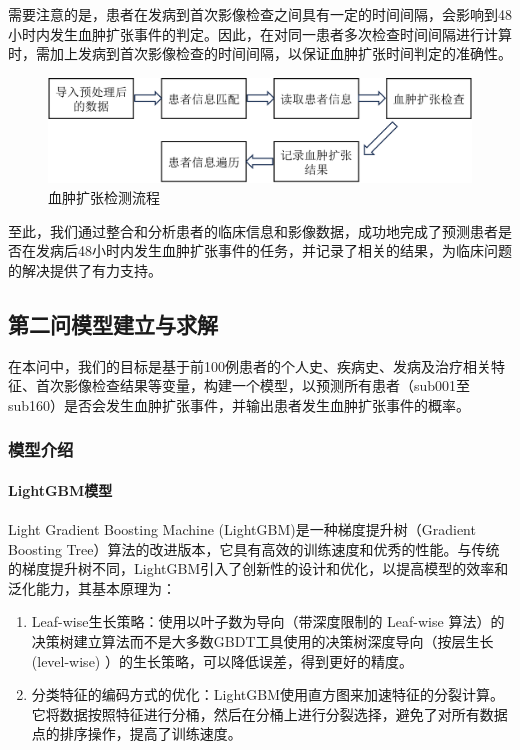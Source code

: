 \documentclass[bwprint]{gmcmthesis}
\begin{document}
需要注意的是，患者在发病到首次影像检查之间具有一定的时间间隔，会影响到48小时内发生血肿扩张事件的判定。因此，在对同一患者多次检查时间间隔进行计算时，需加上发病到首次影像检查的时间间隔，以保证血肿扩张时间判定的准确性。

\begin{figure}[h]
    \centering
    \includegraphics[width = \linewidth]{figures/1a解题思路.png}
    \caption{血肿扩张检测流程}
    \label{fig:1a解题思路}
\end{figure}

至此，我们通过整合和分析患者的临床信息和影像数据，成功地完成了预测患者是否在发病后48小时内发生血肿扩张事件的任务，并记录了相关的结果，为临床问题的解决提供了有力支持。

\subsection{第二问模型建立与求解}
在本问中，我们的目标是基于前100例患者的个人史、疾病史、发病及治疗相关特征、首次影像检查结果等变量，构建一个模型，以预测所有患者（sub001至sub160）是否会发生血肿扩张事件，并输出患者发生血肿扩张事件的概率。\par
\subsubsection{模型介绍}

\paragraph{LightGBM模型} 
\paragraph{\hspace{3em}}Light Gradient Boosting Machine (LightGBM)是一种梯度提升树（Gradient Boosting Tree）算法的改进版本，它具有高效的训练速度和优秀的性能。与传统的梯度提升树不同，LightGBM引入了创新性的设计和优化，以提高模型的效率和泛化能力\cite{ke2017lightgbm}，其基本原理为：

\begin{enumerate}
    \item Leaf-wise生长策略：使用以叶子数为导向（带深度限制的 Leaf-wise 算法）的决策树建立算法而不是大多数GBDT工具使用的决策树深度导向（按层生长 (level-wise) ）的生长策略，可以降低误差，得到更好的精度。
    \item 分类特征的编码方式的优化：LightGBM使用直方图来加速特征的分裂计算。它将数据按照特征进行分桶，然后在分桶上进行分裂选择，避免了对所有数据点的排序操作，提高了训练速度。
\end{enumerate}
\end{document}
